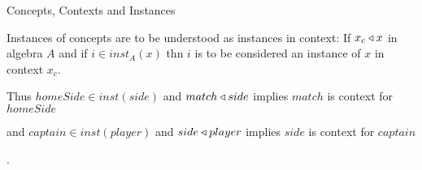 \begin{frame}{Concepts, Contexts  and Instances}
\begin{itemize}
\item Instances of concepts are to be understood as instances in context: If $x_c \triangleleft x$  in algebra $A$ and if $i \in inst_A(x)$ thn $i$ is to be considered an instance of $x$ in context $x_c$.
 {\item Thus $homeSide \in inst(side)$ and $match \triangleleft side$ implies  $match$ is context for $homeSide$}
 {\item and $captain \in inst(player)$ and $side \triangleleft player$ implies $side$ is context for $captain$}.
\end{itemize}
\end{frame}




